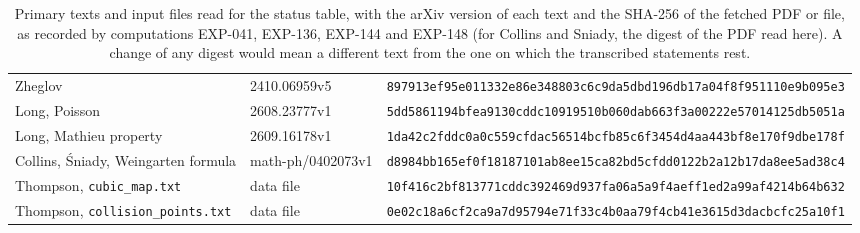 \begin{table}[t]
\begin{tabular}{@{}L{0.26\textwidth}L{0.16\textwidth}L{0.50\textwidth}@{}}
Zheglov & 2410.06959v5 & \texttt{897913ef95e01133\allowbreak 2e86e348803c6c9d\allowbreak a5dbd196db17a04f\allowbreak 8f951110e9b095e3} \\
Long, Poisson & 2608.23777v1 & \texttt{5dd5861194bfea91\allowbreak 30cddc10919510b0\allowbreak 60dab663f3a00222\allowbreak e57014125db5051a} \\
Long, Mathieu property & 2609.16178v1 & \texttt{1da42c2fddc0a0c5\allowbreak 59cfdac56514bcfb\allowbreak 85c6f3454d4aa443\allowbreak bf8e170f9dbe178f} \\
Collins, \'Sniady, Weingarten formula & math-ph/0402073v1 & \texttt{d8984bb165ef0f18\allowbreak 187101ab8ee15ca8\allowbreak 2bd5cfdd0122b2a1\allowbreak 2b17da8ee5ad38c4} \\
Thompson, \texttt{cubic\_map.txt} & data file & \texttt{10f416c2bf813771\allowbreak cddc392469d937fa\allowbreak 06a5a9f4aeff1ed2\allowbreak a99af4214b64b632} \\
Thompson, \texttt{collision\_points.txt} & data file & \texttt{0e02c18a6cf2ca9a\allowbreak 7d95794e71f33c4b\allowbreak 0aa79f4cb41e3615\allowbreak d3dacbcfc25a10f1} \\
\bottomrule
\end{tabular}
\caption{Primary texts and input files read for the status table, with the arXiv version of each text and the SHA-256 of the fetched PDF or file, as recorded by computations EXP-041, EXP-136, EXP-144 and EXP-148 (for Collins and Sniady, the digest of the PDF read here). A change of any digest would mean a different text from the one on which the transcribed statements rest.}
\label{tab:hashes}
\end{table}
